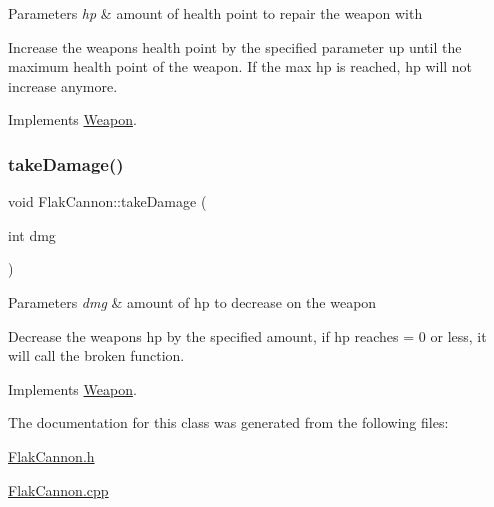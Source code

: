 \begin{DoxyParams}{Parameters}
{\em hp} & amount of health point to repair the weapon with\\
\hline
\end{DoxyParams}
Increase the weapons health point by the specified parameter up until the maximum health point of the weapon. If the max hp is reached, hp will not increase anymore. 

Implements \hyperlink{classWeapon}{Weapon}.

\mbox{\label{classFlakCannon_ae55081dc2801a52421b541e4c42ad415}} 
\subsubsection{\texorpdfstring{take\+Damage()}{takeDamage()}}
{\footnotesize\ttfamily void Flak\+Cannon\+::take\+Damage (\begin{DoxyParamCaption}\item[{int}]{dmg }\end{DoxyParamCaption})\hspace{0.3cm}{\ttfamily [virtual]}}


\begin{DoxyParams}{Parameters}
{\em dmg} & amount of hp to decrease on the weapon\\
\hline
\end{DoxyParams}
Decrease the weapons hp by the specified amount, if hp reaches = 0 or less, it will call the broken function. 

Implements \hyperlink{classWeapon}{Weapon}.



The documentation for this class was generated from the following files\+:\begin{DoxyCompactItemize}
\item 
\hyperlink{FlakCannon_8h}{Flak\+Cannon.\+h}\item 
\hyperlink{FlakCannon_8cpp}{Flak\+Cannon.\+cpp}\end{DoxyCompactItemize}
